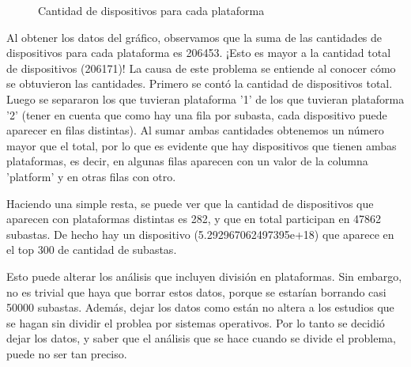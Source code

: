\documentclass[a4paper, 12pt]{article}
\newcommand\tab[1][1cm]{\hspace*{#1}}
\begin{document}
	\FloatBarrier
		\begin{figure}
			\centering
		   	\caption{Cantidad de dispositivos para cada plataforma}
			\label{devicesporSO}
		\end{figure}
	\FloatBarrier

	\tab Al obtener los datos del gráfico, observamos que la suma de las cantidades de dispositivos para cada plataforma es 206453. ¡Esto es mayor a la cantidad total de dispositivos (206171)!\newline
	\tab La causa de este problema se entiende al conocer cómo se obtuvieron las cantidades. Primero se contó la cantidad de dispositivos total. Luego se separaron los que tuvieran plataforma '1' de los que tuvieran plataforma '2' (tener en cuenta que como hay una fila por subasta, cada dispositivo puede aparecer en filas distintas). Al sumar ambas cantidades obtenemos un número mayor que el total, por lo que es evidente que hay dispositivos que tienen ambas plataformas, es decir, en algunas filas aparecen con un valor de la columna 'platform' y en otras filas con otro.

	\tab Haciendo una simple resta, se puede ver que la cantidad de dispositivos que aparecen con plataformas distintas es 282, y que en total participan en 47862 subastas. De hecho hay un dispositivo (5.292967062497395e+18) que aparece en el top 300 de cantidad de subastas.

	\tab Esto puede alterar los análisis que incluyen división en plataformas. Sin embargo, no es trivial que haya que borrar estos datos, porque se estarían borrando casi 50000 subastas. Además, dejar los datos como están no altera a los estudios que se hagan sin dividir el problea por sistemas operativos. Por lo tanto se decidió dejar los datos, y saber que el análisis que se hace cuando se divide el problema, puede no ser tan preciso.
\end{document}
